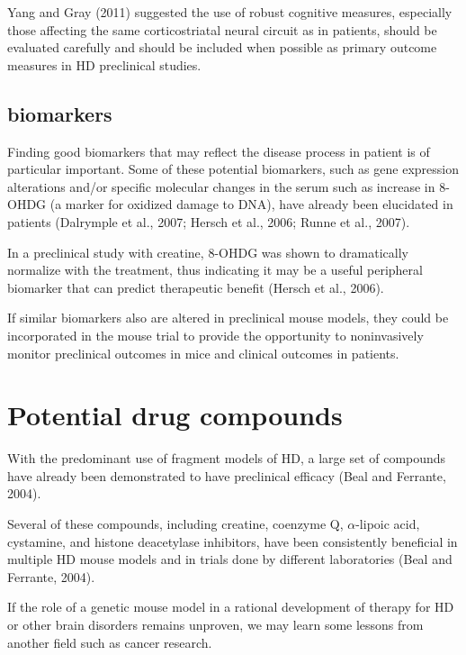 Yang and Gray (2011) suggested the use of robust cognitive measures, especially
those affecting the same corticostriatal neural circuit as in patients, should
be evaluated carefully and should be included when possible as primary outcome
measures in HD preclinical studies.

\subsection{biomarkers}

Finding good biomarkers that may reflect the disease process in patient is of
particular important. Some of these potential biomarkers, such as gene
expression alterations and/or specific molecular changes in the serum such as
increase in 8-OHDG (a marker for oxidized damage to DNA), have already been
elucidated in patients (Dalrymple et al., 2007; Hersch et al., 2006; Runne et
al., 2007).

In a preclinical study with creatine, 8-OHDG was shown to dramatically normalize
with the treatment, thus indicating it may be a useful peripheral biomarker that
can predict therapeutic benefit (Hersch et al., 2006).

If similar biomarkers also are altered in preclinical mouse models, they could
be incorporated in the mouse trial to provide the opportunity to noninvasively
monitor preclinical outcomes in mice and clinical outcomes in patients.

\section{Potential drug compounds}

With the predominant use of fragment models of HD, a large set of compounds have
already been demonstrated to have preclinical efficacy (Beal and Ferrante,
2004). 

Several of these compounds, including creatine, coenzyme Q, $\alpha$-lipoic acid,
cystamine, and histone deacetylase inhibitors, have been consistently beneficial
in multiple HD mouse models and in trials done by different laboratories (Beal
and Ferrante, 2004).

If the role of a genetic mouse model in a rational development of therapy for HD
or other brain disorders remains unproven, we may learn some lessons from
another field such as cancer research.

